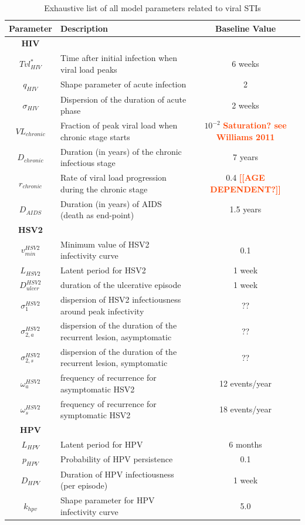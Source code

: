 \documentclass[11pt, onecolumn]{article}
\newcommand{\warning}[1]{\textbf{\textcolor{OrangeRed}{#1}}}
\begin{document}
\renewcommand{\arraystretch}{1.25}
\begin{table}[htdp]

\begin{scriptsize} %

\begin{center}
\begin{tabular}{|clc|}
\hline
\textbf{Parameter}  & \textbf{Description} & \textbf{Baseline Value}\\
\hline
\hline
\textbf{HIV} & & \\
\hline
$Tvl^*_{HIV}$ & Time after initial infection when viral load peaks & 6 weeks\\
$q_{HIV}$ & Shape parameter of acute infection & 2 \\
$\sigma_{HIV}$ & Dispersion of the duration of acute phase & 2 weeks \\
$VL_{chronic}$ & Fraction of peak viral load when chronic stage starts  & $10^{-2}$ \warning{Saturation? see Williams 2011}\\
$D_{chronic}$ & Duration (in years) of the chronic infectious stage & 7 years \\
$r_{chronic}$ & Rate of viral load progression during the chronic stage & 0.4 \warning{[[AGE DEPENDENT?]]}\\
$D_{AIDS}$ & Duration (in years) of AIDS (death as end-point) & 1.5 years \\
\hline
\textbf{HSV2} & & \\
\hline
$v_{min}^{HSV2}$ & Minimum value of HSV2 infectivity curve & 0.1\\
$L_{HSV2}$ & Latent period for HSV2 & 1 week\\
$D_{ulcer}^{HSV2}$ & duration of the ulcerative episode & 1 week\\
$\sigma^{HSV2}_1$ & dispersion of HSV2 infectiousness around peak infectivity & ??\\ 
$\sigma^{HSV2}_{2,a}$ & dispersion of the duration of the recurrent lesion, asymptomatic& ??\\ 
$\sigma^{HSV2}_{2,s}$ & dispersion of the duration of the recurrent lesion, symptomatic& ??\\ 
$\omega_a^{HSV2}$ & frequency of recurrence for asymptomatic HSV2 & 12 events/year\\
$\omega_s^{HSV2}$ & frequency of recurrence for symptomatic HSV2 & 18 events/year\\
\hline
\textbf{HPV} & & \\
\hline
$L_{HPV}$ & Latent period for HPV & 6 months\\
$p_{HPV}$ & Probability of HPV persistence & 0.1\\
$D_{HPV}$ & Duration of HPV infectiousness (per episode) & 1 week\\
$k_{hpv}$  & Shape parameter for HPV infectivity curve & 5.0 \\
\hline

\end{tabular}
\caption{Exhaustive list of all model parameters related to viral STIs}
\label{tab:STIAllParamVirus}
\end{center}
\end{scriptsize}
\end{table}
\end{document}
